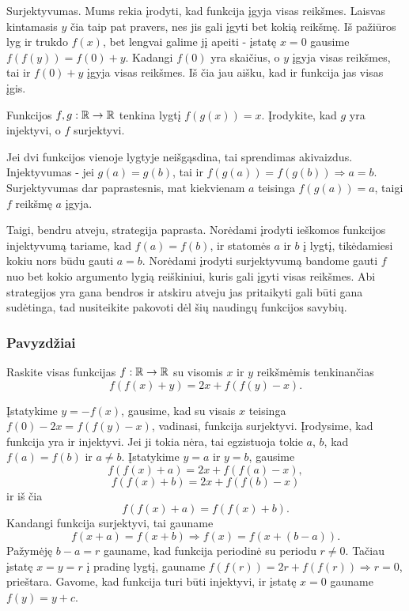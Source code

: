Surjektyvumas. Mums rekia įrodyti, kad funkcija įgyja visas reikšmes.
Laisvas kintamasis $y$ čia taip pat pravers, nes jis gali įgyti bet kokią
reikšmę. Iš pažiūros lyg ir trukdo $f(x)$, bet lengvai galime jį apeiti -
įstatę $x=0$ gausime $f(f(y))=f(0) + y$. Kadangi $f(0)$ yra skaičius, o $y$
įgyja visas reikšmes, tai ir $f(0)+y$ įgyja visas reikšmes. Iš čia jau
aišku, kad ir funkcija jas visas įgis.

\begin{pav}
Funkcijos $f,g:\mathbb R \to \mathbb R$ tenkina lygtį $f(g(x)) = x$. Įrodykite, kad $g$ yra injektyvi, o $f$ surjektyvi.
\end{pav}

Jei dvi funkcijos vienoje lygtyje neišgąsdina, tai sprendimas akivaizdus.
Injektyvumas - jei $g(a)=g(b)$, tai ir $f(g(a))=f(g(b)) \Rightarrow a=b$. Surjektyvumas
dar paprastesnis, mat kiekvienam $a$ teisinga $f(g(a))=a$, taigi $f$
reikšmę $a$ įgyja.

Taigi, bendru atveju, strategija paprasta. Norėdami įrodyti ieškomos
funkcijos injektyvumą tariame, kad $f(a)=f(b)$, ir statomės $a$ ir $b$ į
lygtį, tikėdamiesi kokiu nors būdu gauti $a=b$. Norėdami įrodyti
surjektyvumą bandome gauti $f$ nuo bet kokio argumento lygią reiškiniui,
kuris gali įgyti visas reikšmes. Abi strategijos yra gana bendros ir
atskiru atveju jas pritaikyti gali būti gana sudėtinga, tad nusiteikite
pakovoti dėl šių naudingų funkcijos savybių.


\subsubsection{Pavyzdžiai}

\begin{pavnr} Raskite visas funkcijas $f:\mathbb R \to \mathbb R$ su visomis $x$ ir $y$
  reikšmėmis tenkinančias $$f(f(x)+y) = 2x +f(f(y)-x).$$
\end{pavnr}

\begin{sprendimas}
  Įstatykime $y = -f(x)$, gausime, kad su visais $x$ teisinga $f(0) - 2x =
  f(f(y)-x)$, vadinasi, funkcija surjektyvi.  Įrodysime, kad funkcija
  yra ir injektyvi. Jei ji tokia nėra, tai egzistuoja tokie $a$, $b$,
  kad $f(a)=f(b)$ ir $a\neq b$. Įstatykime $y=a$ ir $y=b$, gausime
  $$f(f(x)+a) = 2x +f(f(a)-x),$$ $$f(f(x)+b) = 2x +f(f(b)-x)$$ ir iš čia
  $$f(f(x)+a)=f(f(x)+b).$$ Kandangi funkcija surjektyvi, tai gauname
  $$f(x+a)=f(x+b) \Rightarrow f(x)=f(x+(b-a)).$$ Pažymėję $b-a=r$
  gauname, kad funkcija periodinė su periodu $r \neq 0$. Tačiau įstatę
  $x=y=r$ į pradinę lygtį, gauname $f(f(r))=2r + f(f(r)) \Rightarrow r =
  0$, prieštara.  Gavome, kad funkcija turi būti injektyvi, ir įstatę $x
  = 0$ gauname $f(y) = y + c$.
\end{sprendimas}

